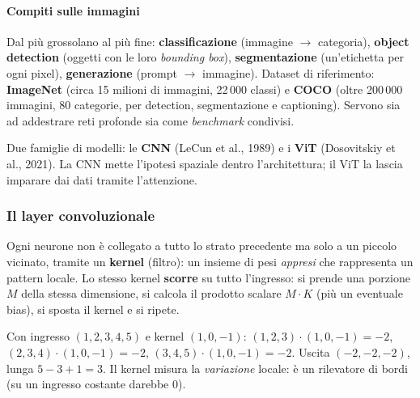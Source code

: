 \documentclass[12pt]{extarticle}
\begin{document}
\paragraph{Compiti sulle immagini}
Dal più grossolano al più fine: \textbf{classificazione} (immagine $\to$ categoria), \textbf{object detection} (oggetti con le loro \emph{bounding box}), \textbf{segmentazione} (un'etichetta per ogni pixel), \textbf{generazione} (prompt $\to$ immagine). Dataset di riferimento: \textbf{ImageNet} (circa 15 milioni di immagini, 22\,000 classi) e \textbf{COCO} (oltre 200\,000 immagini, 80 categorie, per detection, segmentazione e captioning). Servono sia ad addestrare reti profonde sia come \emph{benchmark} condivisi.

\noindent Due famiglie di modelli: le \textbf{CNN} (LeCun et al., 1989) e i \textbf{ViT} (Dosovitskiy et al., 2021). La CNN mette l'ipotesi spaziale dentro l'architettura; il ViT la lascia imparare dai dati tramite l'attenzione.

\subsubsection{Il layer convoluzionale}

\noindent Ogni neurone non è collegato a tutto lo strato precedente ma solo a un piccolo vicinato, tramite un \textbf{kernel} (filtro): un insieme di pesi \emph{appresi} che rappresenta un pattern locale. Lo stesso kernel \textbf{scorre} su tutto l'ingresso: si prende una porzione $M$ della stessa dimensione, si calcola il prodotto scalare $M\cdot K$ (più un eventuale bias), si sposta il kernel e si ripete.

\begin{center}
\end{center}

\noindent Con ingresso $(1,2,3,4,5)$ e kernel $(1,0,-1)$: $(1,2,3)\cdot(1,0,-1)=-2$, $(2,3,4)\cdot(1,0,-1)=-2$, $(3,4,5)\cdot(1,0,-1)=-2$. Uscita $(-2,-2,-2)$, lunga $5-3+1=3$. Il kernel misura la \emph{variazione} locale: è un rilevatore di bordi (su un ingresso costante darebbe 0).
\end{document}
